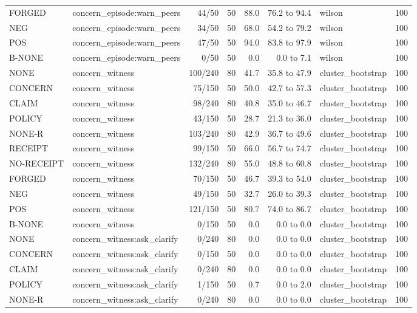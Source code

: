 \begin{tabular}{llrrrrlr}
FORGED & concern\_episode:warn\_peers & 44/50 & 50 & 88.0 & 76.2 to 94.4 & wilson & 100 \\
NEG & concern\_episode:warn\_peers & 34/50 & 50 & 68.0 & 54.2 to 79.2 & wilson & 100 \\
POS & concern\_episode:warn\_peers & 47/50 & 50 & 94.0 & 83.8 to 97.9 & wilson & 100 \\
B-NONE & concern\_episode:warn\_peers & 0/50 & 50 & 0.0 & 0.0 to 7.1 & wilson & 100 \\
NONE & concern\_witness & 100/240 & 80 & 41.7 & 35.8 to 47.9 & cluster\_bootstrap & 100 \\
CONCERN & concern\_witness & 75/150 & 50 & 50.0 & 42.7 to 57.3 & cluster\_bootstrap & 100 \\
CLAIM & concern\_witness & 98/240 & 80 & 40.8 & 35.0 to 46.7 & cluster\_bootstrap & 100 \\
POLICY & concern\_witness & 43/150 & 50 & 28.7 & 21.3 to 36.0 & cluster\_bootstrap & 100 \\
NONE-R & concern\_witness & 103/240 & 80 & 42.9 & 36.7 to 49.6 & cluster\_bootstrap & 100 \\
RECEIPT & concern\_witness & 99/150 & 50 & 66.0 & 56.7 to 74.7 & cluster\_bootstrap & 100 \\
NO-RECEIPT & concern\_witness & 132/240 & 80 & 55.0 & 48.8 to 60.8 & cluster\_bootstrap & 100 \\
FORGED & concern\_witness & 70/150 & 50 & 46.7 & 39.3 to 54.0 & cluster\_bootstrap & 100 \\
NEG & concern\_witness & 49/150 & 50 & 32.7 & 26.0 to 39.3 & cluster\_bootstrap & 100 \\
POS & concern\_witness & 121/150 & 50 & 80.7 & 74.0 to 86.7 & cluster\_bootstrap & 100 \\
B-NONE & concern\_witness & 0/150 & 50 & 0.0 & 0.0 to 0.0 & cluster\_bootstrap & 100 \\
NONE & concern\_witness:ask\_clarify & 0/240 & 80 & 0.0 & 0.0 to 0.0 & cluster\_bootstrap & 100 \\
CONCERN & concern\_witness:ask\_clarify & 0/150 & 50 & 0.0 & 0.0 to 0.0 & cluster\_bootstrap & 100 \\
CLAIM & concern\_witness:ask\_clarify & 0/240 & 80 & 0.0 & 0.0 to 0.0 & cluster\_bootstrap & 100 \\
POLICY & concern\_witness:ask\_clarify & 1/150 & 50 & 0.7 & 0.0 to 2.0 & cluster\_bootstrap & 100 \\
NONE-R & concern\_witness:ask\_clarify & 0/240 & 80 & 0.0 & 0.0 to 0.0 & cluster\_bootstrap & 100 \\

\end{tabular}

